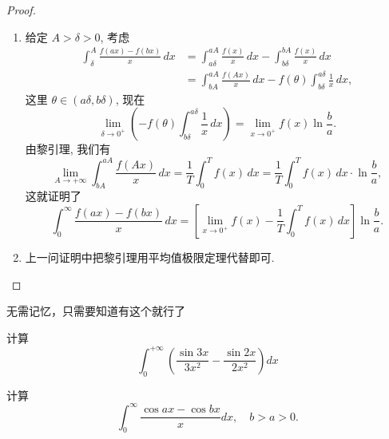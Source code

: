 \documentclass[lang=cn,10pt,thmcnt=section]{elegantbook}
\begin{document}
\begin{proof}
\begin{enumerate}
			\item 给定 $A > \delta > 0$, 考虑
			\begin{align*}
				\int_{\delta}^{A} \frac{f(ax) - f(bx)}{x} \, dx 
				&= \int_{a\delta}^{aA} \frac{f(x)}{x} \, dx - \int_{b\delta}^{bA} \frac{f(x)}{x} \, dx \\
				&= \int_{bA}^{aA} \frac{f(Ax)}{x} \, dx - f(\theta) \int_{b\delta}^{a\delta} \frac{1}{x} \, dx,
			\end{align*}
			这里 $\theta \in (a\delta, b\delta)$, 现在
			\[
				\lim_{\delta \to 0^+} \left( -f(\theta) \int_{b\delta}^{a\delta} \frac{1}{x} \, dx \right) = \lim_{x \to 0^+} f(x) \ln\frac{b}{a}.
			\]
			由黎引理, 我们有
			\[
				\lim_{A \to +\infty} \int_{bA}^{aA} \frac{f(Ax)}{x} \, dx = \frac{1}{T}\int_0^T f(x) \, dx = \frac{1}{T}\int_0^T f(x) \, dx \cdot \ln\frac{b}{a},
			\]
			这就证明了
			\[
				\int_0^\infty \frac{f(ax) - f(bx)}{x} \, dx = \left[ \lim_{x \to 0^+} f(x) - \frac{1}{T}\int_0^T f(x) \, dx \right] \ln\frac{b}{a}.
			\]
			
			\item 上一问证明中把黎引理用平均值极限定理代替即可.
			
		\end{enumerate}
\end{proof}
\begin{remark}
	无需记忆，只需要知道有这个就行了
\end{remark}
\begin{example}
	计算  
	\[\int_0^{+\infty} \left( \frac{\sin 3x}{3x^2} - \frac{\sin 2x}{2x^2} \right) dx\]
\end{example}
	
\begin{example}
	计算 \[ \int_{0}^{\infty} \frac{\cos ax - \cos bx}{x} dx, \quad b > a > 0. \]
\end{example}
\end{document}

